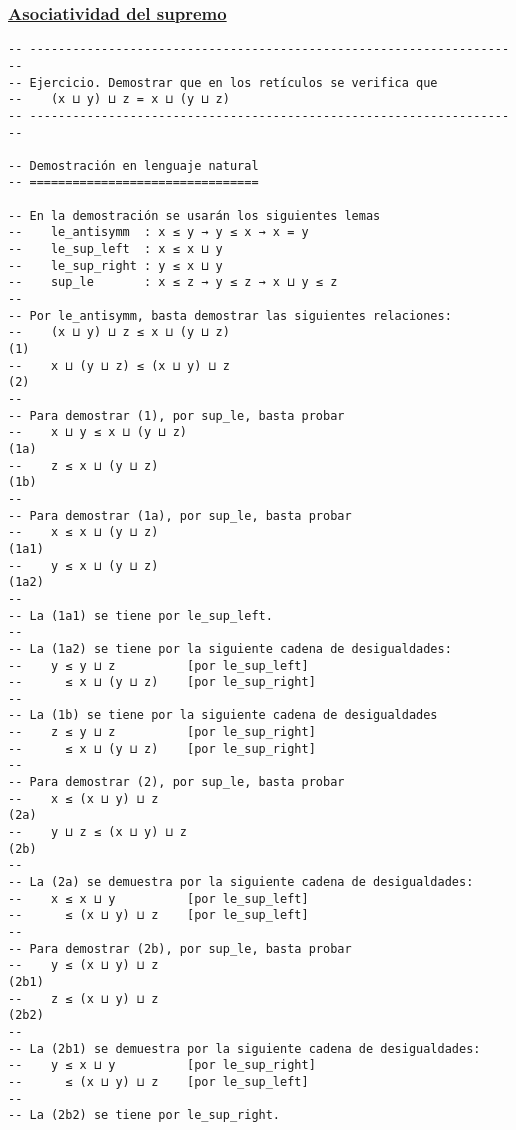 \subsubsection{\href{./src/Basicos/Asociatividad\_del\_supremo.lean}{Asociatividad del supremo}}
\label{sec:org0bb1f3a}
\begin{verbatim}
-- ---------------------------------------------------------------------
-- Ejercicio. Demostrar que en los retículos se verifica que
--    (x ⊔ y) ⊔ z = x ⊔ (y ⊔ z)
-- ---------------------------------------------------------------------

-- Demostración en lenguaje natural
-- ================================

-- En la demostración se usarán los siguientes lemas
--    le_antisymm  : x ≤ y → y ≤ x → x = y
--    le_sup_left  : x ≤ x ⊔ y
--    le_sup_right : y ≤ x ⊔ y
--    sup_le       : x ≤ z → y ≤ z → x ⊔ y ≤ z
--
-- Por le_antisymm, basta demostrar las siguientes relaciones:
--    (x ⊔ y) ⊔ z ≤ x ⊔ (y ⊔ z)                                      (1)
--    x ⊔ (y ⊔ z) ≤ (x ⊔ y) ⊔ z                                      (2)
--
-- Para demostrar (1), por sup_le, basta probar
--    x ⊔ y ≤ x ⊔ (y ⊔ z)                                           (1a)
--    z ≤ x ⊔ (y ⊔ z)                                               (1b)
--
-- Para demostrar (1a), por sup_le, basta probar
--    x ≤ x ⊔ (y ⊔ z)                                              (1a1)
--    y ≤ x ⊔ (y ⊔ z)                                              (1a2)
--
-- La (1a1) se tiene por le_sup_left.
--
-- La (1a2) se tiene por la siguiente cadena de desigualdades:
--    y ≤ y ⊔ z          [por le_sup_left]
--      ≤ x ⊔ (y ⊔ z)    [por le_sup_right]
--
-- La (1b) se tiene por la siguiente cadena de desigualdades
--    z ≤ y ⊔ z          [por le_sup_right]
--      ≤ x ⊔ (y ⊔ z)    [por le_sup_right]
--
-- Para demostrar (2), por sup_le, basta probar
--    x ≤ (x ⊔ y) ⊔ z                                               (2a)
--    y ⊔ z ≤ (x ⊔ y) ⊔ z                                           (2b)
--
-- La (2a) se demuestra por la siguiente cadena de desigualdades:
--    x ≤ x ⊔ y          [por le_sup_left]
--      ≤ (x ⊔ y) ⊔ z    [por le_sup_left]
--
-- Para demostrar (2b), por sup_le, basta probar
--    y ≤ (x ⊔ y) ⊔ z                                              (2b1)
--    z ≤ (x ⊔ y) ⊔ z                                              (2b2)
--
-- La (2b1) se demuestra por la siguiente cadena de desigualdades:
--    y ≤ x ⊔ y          [por le_sup_right]
--      ≤ (x ⊔ y) ⊔ z    [por le_sup_left]
--
-- La (2b2) se tiene por le_sup_right.



\end{verbatim}
